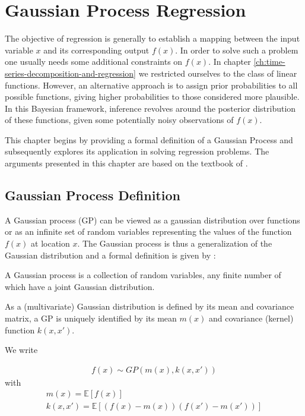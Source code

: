 \usepackage{amsmath}\chapter{Gaussian Process Regression}\label{ch:gaussian-process-regression}
The objective of regression is generally to establish a mapping between the input variable $x$ and
its corresponding output $f(x)$.
In order to solve such a problem one usually needs some additional constraints on $f(x)$.
In chapter \ref{ch:time-series-decomposition-and-regression} we restricted ourselves to the class of linear functions.
However, an alternative approach is to assign prior probabilities to all possible functions,
giving higher probabilities to those considered more plausible. In this Bayesian framework,
inference revolves around the posterior distribution of these functions,
given some potentially noisy observations of $f(x)$.

This chapter begins by providing a formal definition of a Gaussian Process and subsequently explores its application
in solving regression problems.
The arguments presented in this chapter are based on the textbook of \citeauthor{rasmussen_gaussian_2006}.

\section{Gaussian Process Definition}\label{sec:gaussian-process-definition}

A Gaussian process (GP) can be viewed as a gaussian distribution over functions or as an infinite set of random
variables representing the values of the function $f(x)$ at location $x$.
The Gaussian process is thus a generalization of the Gaussian distribution and a formal definition is given
by \citeauthor{rasmussen_gaussian_2006} :

\begin{definition}\label{def:GP}
 A Gaussian process is a collection of random variables, any finite number of which have a joint Gaussian distribution.
\end{definition}


As a (multivariate) Gaussian distribution is defined by its mean and covariance matrix, a GP is
uniquely identified by its mean $m(x)$ and covariance (kernel) function $k(x,x')$.

We write

\begin{gather*}
    f(x) \sim GP(m(x), k(x,x'))
\end{gather*}
with
\begin{gather*}
    m(x) = \mathbb{E}[f(x)] \\
    k(x,x') = \mathbb{E}[(f(x)-m(x))(f(x')-m(x'))]
\end{gather*}

